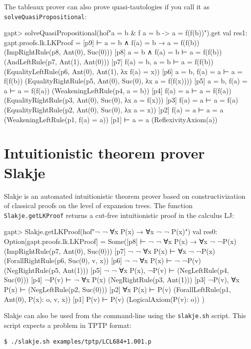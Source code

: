 \documentclass[a4paper,11pt]{book}
\begin{document}
The tableaux prover can also prove quasi-tautologies if you call it as \texttt{solveQuasiPropositional}:
\begin{clilisting}
gapt> solveQuasiPropositional(hof"a = b & f a = b -> a = f(f(b))").get
val res1: gapt.proofs.lk.LKProof =
[p9]  ⊢ a = b ∧ f(a) = b → a = f(f(b))    (ImpRightRule(p8, Ant(0), Suc(0)))
[p8] a = b ∧ f(a) = b ⊢ a = f(f(b))    (AndLeftRule(p7, Ant(1), Ant(0)))
[p7] f(a) = b, a = b ⊢ a = f(f(b))    (EqualityLeftRule(p6, Ant(0), Ant(1), λx f(a) = x))
[p6] a = b, f(a) = a ⊢ a = f(f(b))    (EqualityRightRule(p5, Ant(0), Suc(0), λx a = f(f(x))))
[p5] a = b, f(a) = a ⊢ a = f(f(a))    (WeakeningLeftRule(p4, a = b))
[p4] f(a) = a ⊢ a = f(f(a))    (EqualityRightRule(p3, Ant(0), Suc(0), λx a = f(x)))
[p3] f(a) = a ⊢ a = f(a)    (EqualityRightRule(p2, Ant(0), Suc(0), λx a = x))
[p2] f(a) = a ⊢ a = a    (WeakeningLeftRule(p1, f(a) = a))
[p1]  ⊢ a = a    (ReflexivityAxiom(a))

\end{clilisting}

\section{Intuitionistic theorem prover Slakje}

Slakje is an automated intuitionistic theorem prover based on
constructivization of classical proofs on the level of expansion trees.  The
function \texttt{Slakje.getLKProof} returns a cut-free intuitionistic proof in
the calculus LJ:
\begin{clilisting}
gapt> Slakje.getLKProof(hof"¬ ¬ ∀x P(x) → ∀x ¬ ¬ P(x)")
val res0: Option[gapt.proofs.lk.LKProof] =
Some([p8]  ⊢ ¬ ¬ ∀x P(x) → ∀x ¬ ¬P(x)    (ImpRightRule(p7, Ant(0), Suc(0)))
[p7] ¬ ¬ ∀x P(x) ⊢ ∀x ¬ ¬P(x)    (ForallRightRule(p6, Suc(0), v, x))
[p6] ¬ ¬ ∀x P(x) ⊢ ¬ ¬P(v)    (NegRightRule(p5, Ant(1)))
[p5] ¬ ¬ ∀x P(x), ¬P(v) ⊢     (NegLeftRule(p4, Suc(0)))
[p4] ¬P(v) ⊢ ¬ ∀x P(x)    (NegRightRule(p3, Ant(1)))
[p3] ¬P(v), ∀x P(x) ⊢     (NegLeftRule(p2, Suc(0)))
[p2] ∀x P(x) ⊢ P(v)    (ForallLeftRule(p1, Ant(0), P(x): o, v, x))
[p1] P(v) ⊢ P(v)    (LogicalAxiom(P(v): o))
)

\end{clilisting}

Slakje can also be used from the command-line using the \texttt{slakje.sh}
script.  This script expects a problem in TPTP format:
\begin{lstlisting}
$ ./slakje.sh examples/tptp/LCL684+1.001.p
\end{lstlisting}
\end{document}
